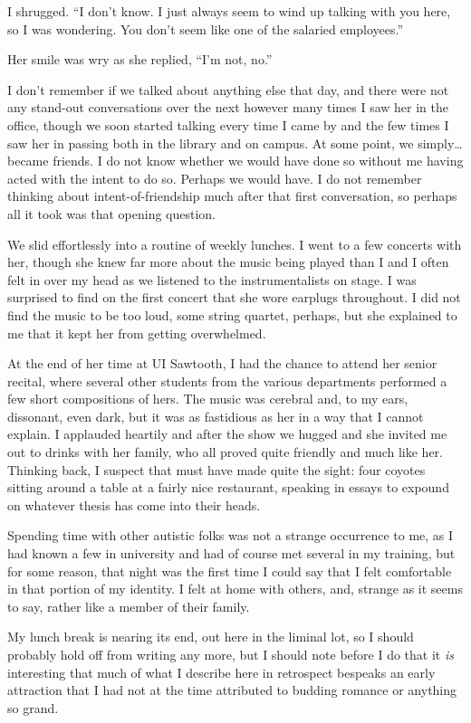 I shrugged. ``I don't know. I just always seem to wind up talking with you here, so I was wondering. You don't seem like one of the salaried employees.''

Her smile was wry as she replied, ``I'm not, no.''

I don't remember if we talked about anything else that day, and there were not any stand-out conversations over the next however many times I saw her in the office, though we soon started talking every time I came by and the few times I saw her in passing both in the library and on campus. At some point, we simply\ldots became friends. I do not know whether we would have done so without me having acted with the intent to do so. Perhaps we would have. I do not remember thinking about intent-of-friendship much after that first conversation, so perhaps all it took was that opening question.

We slid effortlessly into a routine of weekly lunches. I went to a few concerts with her, though she knew far more about the music being played than I and I often felt in over my head as we listened to the instrumentalists on stage. I was surprised to find on the first concert that she wore earplugs throughout. I did not find the music to be too loud, some string quartet, perhaps, but she explained to me that it kept her from getting overwhelmed.

At the end of her time at UI Sawtooth, I had the chance to attend her senior recital, where several other students from the various departments performed a few short compositions of hers. The music was cerebral and, to my ears, dissonant, even dark, but it was as fastidious as her in a way that I cannot explain. I applauded heartily and after the show we hugged and she invited me out to drinks with her family, who all proved quite friendly and much like her. Thinking back, I suspect that must have made quite the sight: four coyotes sitting around a table at a fairly nice restaurant, speaking in essays to expound on whatever thesis has come into their heads.

Spending time with other autistic folks was not a strange occurrence to me, as I had known a few in university and had of course met several in my training, but for some reason, that night was the first time I could say that I felt comfortable in that portion of my identity. I felt at home with others, and, strange as it seems to say, rather like a member of their family.

My lunch break is nearing its end, out here in the liminal lot, so I should probably hold off from writing any more, but I should note before I do that it \emph{is} interesting that much of what I describe here in retrospect bespeaks an early attraction that I had not at the time attributed to budding romance or anything so grand.

